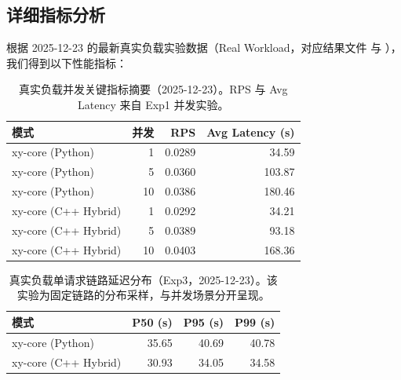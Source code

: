 \documentclass[a4paper,12pt]{article}
\begin{document}
\subsection{详细指标分析}

根据 2025-12-23 的最新真实负载实验数据（Real Workload，对应结果文件 \texttt{} 与 \texttt{}），我们得到以下性能指标：

\begin{table}[H]
\centering
\begin{tabular}{lrrr}
\toprule
\textbf{模式} & \textbf{并发} & \textbf{RPS} & \textbf{Avg Latency (s)}\\
\midrule
xy-core (Python) & 1 & 0.0289 & 34.59\\
xy-core (Python) & 5 & 0.0360 & 103.87\\
xy-core (Python) & 10 & 0.0386 & 180.46\\
xy-core (C++ Hybrid) & 1 & 0.0292 & 34.21\\
xy-core (C++ Hybrid) & 5 & 0.0389 & 93.18\\
xy-core (C++ Hybrid) & 10 & 0.0403 & 168.36\\
\bottomrule
\end{tabular}
\caption{真实负载并发关键指标摘要（2025-12-23）。RPS 与 Avg Latency 来自 Exp1 并发实验。}
\end{table}

\begin{table}[H]
\centering
\begin{tabular}{lrrr}
\toprule
\textbf{模式} & \textbf{P50 (s)} & \textbf{P95 (s)} & \textbf{P99 (s)}\\
\midrule
xy-core (Python) & 35.65 & 40.69 & 40.78\\
xy-core (C++ Hybrid) & 30.93 & 34.05 & 34.58\\
\bottomrule
\end{tabular}
\caption{真实负载单请求链路延迟分布（Exp3，2025-12-23）。该实验为固定链路的分布采样，与并发场景分开呈现。}
\end{table}
\end{document}
